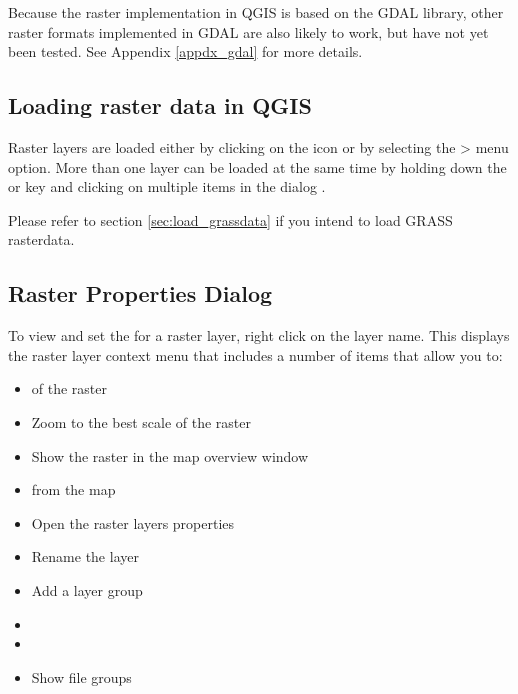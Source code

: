 Because the raster implementation in QGIS is based on the GDAL library, other
raster formats implemented in GDAL are also likely to work, but have not yet
been tested. See Appendix \ref{appdx_gdal} for more
details.
	
\subsection{Loading raster data in QGIS}\label{label_loadraster}

Raster layers are loaded either by clicking on the 
 icon or by
selecting the > menu option. More than one 
layer can be loaded at the same time by holding down the
 or  key
and clicking on multiple items in the dialog .

Please refer to section \ref{sec:load_grassdata} if you intend to load GRASS rasterdata.
	
\subsection{Raster Properties Dialog}\label{label_rasterprop}

To view and set the  for a raster layer, right click on the layer
name. This displays the raster layer context menu that includes a number of
items that allow you to:

\begin{itemize}
\item {} of the raster
\item Zoom to the best scale of the raster
\item Show the raster in the map overview window
\item {} from the map
\item Open the raster layers properties
\item Rename the layer
\item Add a layer group
\item {}
\item {}
\item Show file groups
\end{itemize}

